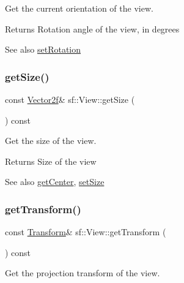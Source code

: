 Get the current orientation of the view. 

\begin{DoxyReturn}{Returns}
Rotation angle of the view, in degrees
\end{DoxyReturn}
\begin{DoxySeeAlso}{See also}
\hyperlink{classsf_1_1_view_a24d0503c9c51f5ef5918612786d325c1}{set\+Rotation} 
\end{DoxySeeAlso}
\mbox{\label{classsf_1_1_view_a5432748dd3a78ac4019dfbde208c7cc1}} 
\subsubsection{\texorpdfstring{get\+Size()}{getSize()}}
{\footnotesize\ttfamily const \hyperlink{classsf_1_1_vector2}{Vector2f}\& sf\+::\+View\+::get\+Size (\begin{DoxyParamCaption}{ }\end{DoxyParamCaption}) const}



Get the size of the view. 

\begin{DoxyReturn}{Returns}
Size of the view
\end{DoxyReturn}
\begin{DoxySeeAlso}{See also}
\hyperlink{classsf_1_1_view_a7f4443c194c691ae4dcf8fd9dd0eaa46}{get\+Center}, \hyperlink{classsf_1_1_view_a9525b73fe9fbaceb9568faf56b399dab}{set\+Size} 
\end{DoxySeeAlso}
\mbox{\label{classsf_1_1_view_a13da786526688bf99dc2cd3e658a3c2a}} 
\subsubsection{\texorpdfstring{get\+Transform()}{getTransform()}}
{\footnotesize\ttfamily const \hyperlink{classsf_1_1_transform}{Transform}\& sf\+::\+View\+::get\+Transform (\begin{DoxyParamCaption}{ }\end{DoxyParamCaption}) const}



Get the projection transform of the view. 

